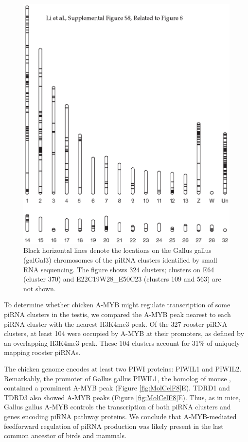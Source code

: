     \begin{figure}[htbp] %
      \centering 
      \includegraphics{Figures/MolCel/MolCel2013_FigS8.eps}
      \caption[Genomic Locations of piRNA Clusters in the Rooster (Gallus gallus) Testis.]
      {
     	 Black horizontal lines denote the locations on the Gallus gallus (galGal3) chromosomes of the piRNA clusters identified by small RNA sequencing. The figure shows 324 clusters; clusters on E64 (cluster 370) and E22C19W28_E50C23 (clusters 109 and 563) are not shown.
     	 }
      \label{fig:MolCelS8}
    	\end{figure}

    To determine whether chicken A-MYB might regulate transcription of some piRNA clusters in the testis, we compared the A-MYB peak nearest to each piRNA cluster with the nearest H3K4me3 peak. Of the 327 rooster piRNA clusters, at least 104 were occupied by A-MYB at their promoters, as defined by an overlapping H3K4me3 peak. These 104 clusters account for 31\% of uniquely mapping rooster piRNAs.

    The chicken genome encodes at least two PIWI proteins: PIWIL1 and PIWIL2. Remarkably, the promoter of Gallus gallus PIWIL1, the homolog of mouse \miwi{}, contained a prominent A-MYB peak (Figure \ref{fig:MolCelF8}E). TDRD1 and TDRD3 also showed A-MYB peaks (Figure \ref{fig:MolCelF8}E). Thus, as in mice, Gallus gallus A-MYB controls the transcription of both piRNA clusters and genes encoding piRNA pathway proteins. We conclude that A-MYB-mediated feedforward regulation of piRNA production was likely present in the last common ancestor of birds and mammals.

